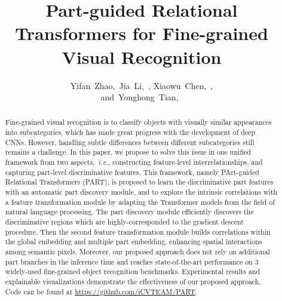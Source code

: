 \documentclass[journal]{IEEEtran}
\def\ie{{\em i.e.}}
\begin{document}
\title{Part-guided Relational Transformers for Fine-grained Visual Recognition}

\author{Yifan~Zhao,~Jia~Li,~, Xiaowu~Chen,~, \\ and~Yonghong~Tian,~}



\maketitle

\begin{abstract}
Fine-grained visual recognition is to classify objects with visually similar appearances into subcategories, which has made great progress with the development of deep CNNs. However, handling subtle differences between different subcategories still remains a challenge. In this paper, we propose to solve this issue in one unified framework from two aspects,~\ie, constructing feature-level interrelationships, and capturing part-level discriminative features. This framework, namely PArt-guided Relational Transformers (PART), is proposed to learn the discriminative part features with an automatic part discovery module, and to explore the intrinsic correlations with a feature transformation module by adapting the Transformer models from the field of natural language processing. The part discovery module efficiently discovers the discriminative regions which are highly-corresponded to the gradient descent procedure. Then the second feature transformation module builds correlations within the global embedding and multiple part embedding, enhancing spatial interactions among semantic pixels.
Moreover, our proposed approach does not rely on additional part branches in the inference time and reaches state-of-the-art performance on 3 widely-used fine-grained object recognition benchmarks. Experimental results and explainable visualizations demonstrate the effectiveness of our proposed approach. Code can be found at {\color{blue}\url{https://github.com/iCVTEAM/PART}}.

\end{abstract}
\end{document}
